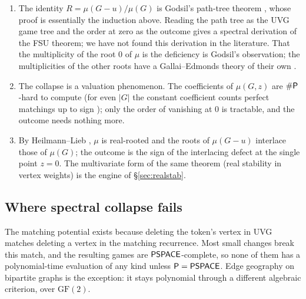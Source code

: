 \begin{remark*}
\begin{enumerate}[label=(\arabic*)]
\item The identity $R=\mu(G-u)/\mu(G)$ is Godsil's path-tree theorem \cite{Godsil81,GodsilBook}, whose proof is essentially the induction above. Reading the path tree as the UVG game tree and the order at zero as the outcome gives a spectral derivation of the FSU theorem; we have not found this derivation in the literature. That the multiplicity of the root $0$ of $\mu$ is the deficiency is Godsil's observation; the multiplicities of the other roots have a Gallai--Edmonds theory of their own \cite{Godsil95,KuChen}.
\item The collapse is a valuation phenomenon. The coefficients of $\mu(G,z)$ are $\#\mathsf{P}$-hard to compute (for even $|G|$ the constant coefficient counts perfect matchings up to sign \cite{Valiant}); only the order of vanishing at $0$ is tractable, and the outcome needs nothing more.
\item By Heilmann--Lieb \cite{HeilmannLieb}, $\mu$ is real-rooted and the roots of $\mu(G-u)$ interlace those of $\mu(G)$; the outcome is the sign of the interlacing defect at the single point $z=0$. The multivariate form of the same theorem (real stability in vertex weights) is the engine of \S\ref{sec:realstab}.
\end{enumerate}
\end{remark*}

\subsection{Where spectral collapse fails}\label{ssec:fails}
The matching potential exists because deleting the token's vertex in UVG matches deleting a vertex in the matching recurrence. Most small changes break this match, and the resulting games are $\mathsf{PSPACE}$-complete, so none of them has a polynomial-time evaluation of any kind unless $\mathsf{P}=\mathsf{PSPACE}$. Edge geography on bipartite graphs is the exception: it stays polynomial through a different algebraic criterion, over $\mathrm{GF}(2)$.

